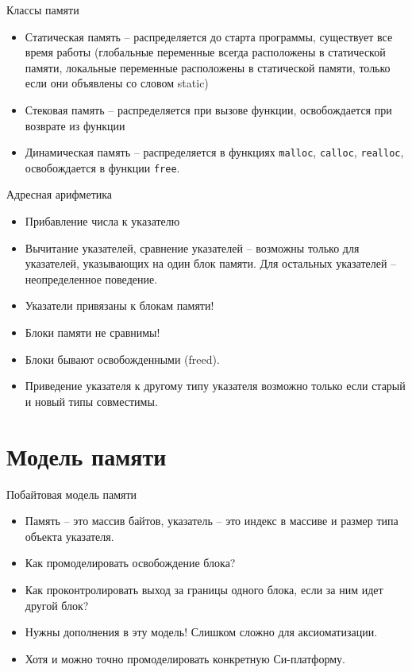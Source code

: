 \documentclass[hyperref={unicode=true}]{beamer}
\begin{document}
    \begin{frame}{Классы памяти}
    \begin{itemize}
    \item
    Статическая память -- распределяется до старта
    программы, существует все время работы
    (глобальные переменные всегда расположены в
     статической памяти, локальные переменные
     расположены в статической памяти, только если
     они объявлены со словом static)
    \item
    Стековая память -- распределяется при
    вызове функции, освобождается при возврате
    из функции
    \item
    Динамическая память -- распределяется в функциях
    \texttt{malloc}, \texttt{calloc}, \texttt{realloc},
    освобождается в функции \texttt{free}.
    \end{itemize}
    \end{frame}

    \begin{frame}{Адресная арифметика}
    \begin{itemize}
    \item
    Прибавление числа к указателю
    \item
    Вычитание указателей, сравнение указателей
    -- возможны только для указателей, указывающих
    на один блок памяти. Для остальных
    указателей -- неопределенное поведение.
    \item
    Указатели привязаны к блокам памяти!
    \item
    Блоки памяти не сравнимы!
    \item
    Блоки бывают освобожденными (freed).
    \item
    Приведение указателя к другому типу указателя возможно
    только если старый и новый типы совместимы.
    \end{itemize}
    \end{frame}
\fi
    \section{Модель памяти}

\iffalse
    \begin{frame}{Побайтовая модель памяти}
    \begin{itemize}
    \item Память -- это массив байтов, указатель --
    это индекс в массиве и размер типа объекта указателя.
    \item Как промоделировать освобождение блока?
    \item
    Как проконтролировать выход за границы одного блока,
    если за ним идет другой блок?
    \item Нужны дополнения
    в эту модель! Слишком сложно для аксиоматизации.
    \item Хотя и можно точно промоделировать конкретную
    Си-платформу.
    \end{itemize}
    \end{frame}
\end{document}
